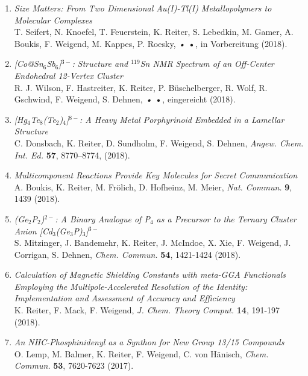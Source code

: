 \begin{enumerate}

\item \textit{Size Matters: From Two Dimensional Au(I)-Tl(I) Metallopolymers to Molecular Complexes}\\
T. Seifert, N. Knoefel, T. Feuerstein, K. Reiter, S. Lebedkin, M. Gamer, A. Boukis, F. Weigend, M. Kappes, P. Roesky, \textit{•} \textbf{•}, in Vorbereitung (2018).

\item \textit{[Co@Sn$_6$Sb$_6$]$^{3-}$: Structure and $^{119}$Sn NMR Spectrum of an Off-Center Endohedral 12-Vertex Cluster}\\
R. J. Wilson, F. Hastreiter, K. Reiter, P. Büschelberger, R. Wolf, R. Gschwind, F. Weigend, S. Dehnen, \textit{•} \textbf{•}, eingereicht (2018).

\item \textit{[Hg$_4$Te$_8$(Te$_2$)$_4$]$^{8-}$: A Heavy Metal Porphyrinoid Embedded in a Lamellar Structure}\\
C. Donsbach, K. Reiter, D. Sundholm, F. Weigend, S. Dehnen, \textit{Angew. Chem. Int. Ed.} \textbf{57}, 8770–8774, (2018).

\item \textit{Multicomponent Reactions Provide Key Molecules for Secret Communication}\\ 
A. Boukis, K. Reiter, M. Frölich, D. Hofheinz, M. Meier, \textit{Nat. Commun.} \textbf{9}, 1439 (2018).

\item \textit{(Ge$_2$P$_2$)$^{2-}$: A Binary Analogue of P$_4$ as a Precursor to the Ternary Cluster Anion [Cd$_3$(Ge$_3$P)$_3$]$^{3-}$}\\
S. Mitzinger, J. Bandemehr, K. Reiter, J. McIndoe, X. Xie, F. Weigend, J. Corrigan, S. Dehnen, \textit{Chem. Commun.} \textbf{54}, 1421-1424 (2018).

\item \textit{Calculation of Magnetic Shielding Constants with meta-GGA Functionals Employing the Multipole-Accelerated Resolution of the Identity: Implementation and Assessment of Accuracy and Efficiency}\\ 
K. Reiter, F. Mack, F. Weigend, \textit{J. Chem. Theory Comput.} \textbf{14}, 191-197 (2018).

\item \textit{An NHC-Phosphinidenyl as a Synthon for New Group 13/15 Compounds}\\
O. Lemp, M. Balmer, K. Reiter, F. Weigend, C. von Hänisch, \textit{Chem. Commun.} \textbf{53}, 7620-7623 (2017).


\end{enumerate}
